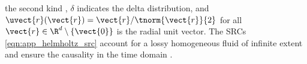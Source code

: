 the second kind
\cite[§10.2(ii) and 10.4.3]{book:OlverNHMF2010},
$\delta$ indicates
the  delta distribution, and
$\uvect{r}( \vect{r} ) = \vect{r} / \tnorm{ \vect{r} }{2}$ for
all $\vect{r} \in \R^{d} \setminus \{ \vect{0} \}$ is
the radial unit vector.
The \acp{SRC}
\eqref{eqn:app_helmholtz_src} account for
a lossy homogeneous fluid of
infinite extent and ensure
the causality in
the time domain
\cite[Sect. 2.1.4]{book:Devaney2012}.
